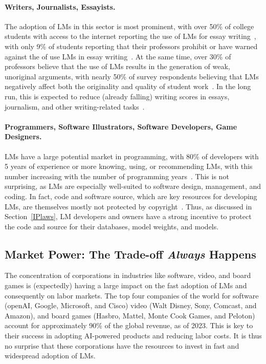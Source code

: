 \documentclass{article} %
\begin{document}
\paragraph{Writers, Journalists, Essayists.}
The adoption of LMs in this sector is most prominent, with over 50\% of college students with access to the internet reporting the use of LMs for essay writing~\citep{harvard2025chatgpt}, with only 9\% of students reporting that their professors prohibit or have warned against the of use LMs in essay writing~\citep{si2024can}.
At the same time, over 30\% of professors believe that the use of LMs results in the generation of weak, unoriginal arguments, with nearly 50\% of survey respondents believing that LMs negatively affect both the originality and quality of student work~\citep{porter2024ai}.
In the long run, this is expected to reduce (already falling) writing scores in essays, journalism, and other writing-related tasks~\citep{moon2024homogenizing}.
\paragraph{Programmers, Software Illustrators, Software Developers, Game Designers.}
LMs have a large potential market in programming, with 80\% of developers with 5 years of experience or more knowing, using, or recommending LMs, with this number increasing with the number of programming years~\citep{peng2023impact}.
This is not surprising, as LMs are especially well-suited to software design, management, and coding.
In fact, code and software source, which are key resources for developing LMs, are themselves mostly not protected by copyright~\citep{henderson2023foundation}.
Thus, as discussed in Section~\ref{IPlaws}, LM developers and owners have a strong incentive to protect the code and source for their databases, model weights, and models.

\subsection{Market Power: The Trade-off \emph{Always} Happens}

The concentration of corporations in industries like software, video, and board games is (expectedly) having a large impact on the fast adoption of LMs and consequently on labor markets.
The top four companies of the world for software (openAI, Google, Microsoft, and Cisco) video (Walt Disney, Sony, Comcast, and Amazon), and board games (Hasbro, Mattel, Monte Cook Games, and Peloton) account for approximately 90\% of the global revenue, as of 2023.
This is key to their success in adopting AI-powered products and reducing labor costs.
It is thus no surprise that these corporations have the resources to invest in fast and widespread adoption of LMs.
\end{document}

